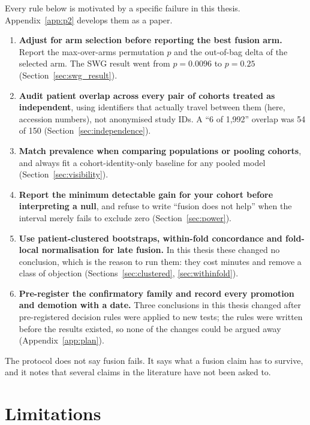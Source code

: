 Every rule below is motivated by a specific failure in this thesis. Appendix~\ref{app:p2} develops them as a paper.

\begin{enumerate}
\item \textbf{Adjust for arm selection before reporting the best fusion arm.} Report the max-over-arms permutation $p$ and the out-of-bag delta of the selected arm. The SWG result went from $p=0.0096$ to $p=0.25$ (Section~\ref{sec:swg_result}).
\item \textbf{Audit patient overlap across every pair of cohorts treated as independent}, using identifiers that actually travel between them (here, accession numbers), not anonymised study IDs. A ``6 of 1,992'' overlap was 54 of 150 (Section~\ref{sec:independence}).
\item \textbf{Match prevalence when comparing populations or pooling cohorts}, and always fit a cohort-identity-only baseline for any pooled model (Section~\ref{sec:visibility}).
\item \textbf{Report the minimum detectable gain for your cohort before interpreting a null}, and refuse to write ``fusion does not help'' when the interval merely fails to exclude zero (Section~\ref{sec:power}).
\item \textbf{Use patient-clustered bootstraps, within-fold concordance and fold-local normalisation for late fusion.} In this thesis these changed no conclusion, which is the reason to run them: they cost minutes and remove a class of objection (Sections~\ref{sec:clustered}, \ref{sec:withinfold}).
\item \textbf{Pre-register the confirmatory family and record every promotion and demotion with a date.} Three conclusions in this thesis changed after pre-registered decision rules were applied to new tests; the rules were written before the results existed, so none of the changes could be argued away (Appendix~\ref{app:plan}).
\end{enumerate}

The protocol does not say fusion fails. It says what a fusion claim has to survive, and it notes that several claims in the literature have not been asked to.

\section{Limitations}
\label{sec:limitations}

